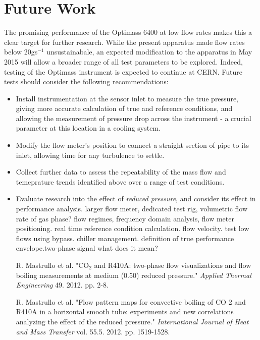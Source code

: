 \documentclass{report}
\begin{document}
\chapter{Future Work} \label{further research}
The promising performance of the Optimass 6400 at low flow rates makes this a clear target for further research. While the present apparatus made flow rates below 20gs$^{-1}$ unsustainabale, an expected modification to the apparatus in May 2015 will allow a broader range of all test parameters to be explored. Indeed, testing of the Optimass instrument is expected to continue at CERN. Future tests should consider the following recommendations:
\begin{itemize}
\item{Install instrumentation at the sensor inlet to measure the true pressure, giving more accurate calculation of true and reference conditions, and allowing the measurement of pressure drop across the instrument - a crucial parameter at this location in a cooling system.}
\item{Modify the flow meter's position to connect a straight section of pipe to its inlet, allowing time for any turbulence to settle.}
\item{Collect further data to assess the repeatability of the mass flow and temeprature trends identified above over a range of test conditions.}
\item{Evaluate research into the effect of \textit{reduced pressure}, and consider its effect in performance analysis.}
larger flow meter, dedicated test rig, volumetric flow rate of gas phase? flow regimes, frequency domain analysis, flow meter positioning. real time reference condition calculation. flow velocity. test low flows using bypass. chiller management. definition of true performance envelope.two-phase signal what does it mean?

\begin{thebibliography}{9}

R. Mastrullo et al. "CO$_2$ and R410A: two-phase flow visualizations and flow boiling measurements at medium (0.50) reduced pressure." \textit{Applied Thermal Engineering} 49. 2012. pp. 2-8.

R. Mastrullo et al. "Flow pattern maps for convective boiling of CO 2 and R410A in a horizontal smooth tube: experiments and new correlations analyzing the effect of the reduced pressure." \textit{International Journal of Heat and Mass Transfer} vol. 55.5. 2012. pp. 1519-1528.


\end{thebibliography}
\end{itemize}
\end{document}
